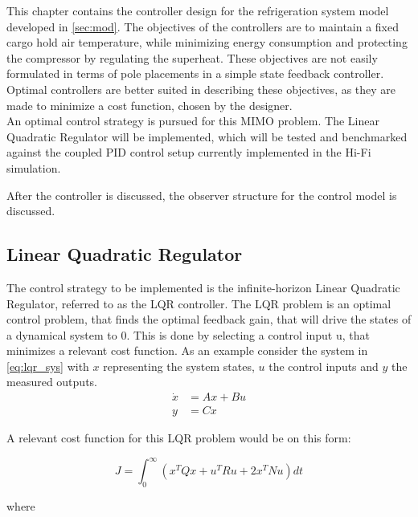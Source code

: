 This chapter contains the controller design for the refrigeration system model developed in \cref{sec:mod}. The objectives of the controllers are to maintain a fixed cargo hold air temperature, while minimizing energy consumption and protecting the compressor by regulating the superheat. These objectives are not easily formulated in terms of pole placements in a simple state feedback controller. Optimal controllers are better suited in describing these objectives, as they are made to minimize a cost function, chosen by the designer. \\

An optimal control strategy is pursued for this MIMO problem. The Linear Quadratic Regulator will be implemented, which will be tested and benchmarked against the coupled PID control setup currently implemented in the Hi-Fi simulation.

After the controller is discussed, the observer structure for the control model is discussed.


\subsection{Linear Quadratic Regulator} \label{sec:linear-quadratic-regulator}
The control strategy to be implemented is the infinite-horizon Linear Quadratic Regulator, referred to as the LQR controller. The LQR problem is an optimal control problem, that finds the optimal feedback gain, that will drive the states of a dynamical system to 0. This is done by selecting a control input u, that minimizes a relevant cost function. As an example consider the system in \cref{eq:lqr_sys} with $x$ representing the system states, $u$ the control inputs and $y$ the measured outputs.\\

\begin{equation} \label{eq:lqr_sys}
	\begin{split}
		\dot{x} 	& = Ax + Bu \\
		y 	& = Cx
	\end{split}
\end{equation}

A relevant cost function for this LQR problem would be on this form:

\begin{equation} \label{eq:lqr_cost_fcn}
	J = \int_0^{\infty} \left(x^TQx + u^TRu + 2x^TNu\right)dt
\end{equation}

where

